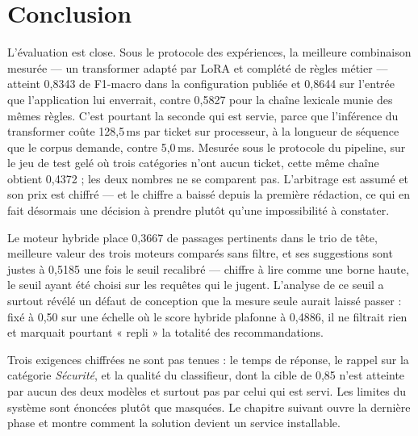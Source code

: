 \FloatBarrier

\section*{Conclusion}

L'évaluation est close. Sous le protocole des expériences, la meilleure combinaison mesurée — un
transformer adapté par LoRA et complété de règles métier — atteint 0,8343 de F1-macro dans la
configuration publiée et 0,8644 sur l'entrée que l'application lui enverrait, contre
0,5827 pour la chaîne lexicale munie des mêmes règles. C'est pourtant la seconde qui est servie,
parce que l'inférence du transformer coûte 128,5\,ms par ticket sur processeur, à la longueur de
séquence que le corpus demande, contre 5,0\,ms.
Mesurée sous le protocole du pipeline, sur le jeu de test gelé où trois catégories n'ont aucun
ticket, cette même chaîne obtient 0,4372 ; les deux nombres ne se comparent pas. L'arbitrage est
assumé et son prix est chiffré — et le chiffre a baissé depuis la première rédaction, ce qui en
fait désormais une décision à prendre plutôt qu'une impossibilité à constater.

Le moteur hybride place 0,3667 de passages pertinents dans le trio de tête, meilleure valeur des
trois moteurs comparés sans filtre, et ses suggestions sont justes à 0,5185 une fois le seuil
recalibré — chiffre à lire comme une borne haute, le seuil ayant été choisi sur les requêtes qui
le jugent. L'analyse de ce seuil a surtout révélé un défaut de conception que la mesure seule
aurait laissé passer : fixé à 0,50 sur une échelle où le score hybride plafonne à 0,4886, il ne
filtrait rien et marquait pourtant « repli » la totalité des recommandations.

Trois exigences chiffrées ne sont pas tenues : le temps de réponse, le rappel sur la catégorie
\emph{Sécurité}, et la qualité du classifieur, dont la cible de 0,85 n'est atteinte par aucun des
deux modèles et surtout pas par celui qui est servi. Les limites du système sont énoncées plutôt que masquées. Le chapitre suivant
ouvre la dernière phase et montre comment la solution devient un service installable.
